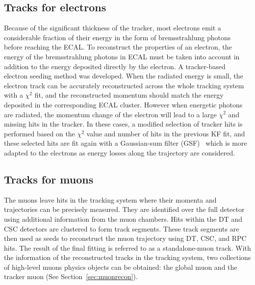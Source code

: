 \subsection{Tracks for electrons}
Because of the significant thickness of the tracker, most electrons emit a considerable fraction of their energy in the form of bremsstrahlung photons before reaching the ECAL. To reconstruct the properties of an electron, the energy of the bremsstrahlung photons in ECAL must be taken into account in addition to the energy deposited directly by the electron. A tracker-based electron seeding method was developed. When the radiated energy is small, the electron track can be accurately reconstructed across the whole tracking system with a $\chi^2$ fit, and the reconstructed momentum should match the energy deposited in the corresponding ECAL cluster. However when energetic photons are radiated, the momentum change of the electron will lead to a large $\chi^2$ and missing hits in the tracker. In these cases, a modified selection of tracker hits is performed based on the $\chi^2$ value and number of hits in the previous KF fit, and these selected hits are fit again with a Gaussian-sum filter (GSF)~\cite{ob_electronconst} which is more adapted to the electrons as energy losses along the trajectory are considered. 

\subsection{Tracks for muons}
The muons leave hits in the tracking system where their momenta and trajectories can be precisely measured. They are identified over the full detector using additional information from the muon chambers. Hits within the DT and CSC detectors are clustered to form track segments. These track segments are then used as seeds to reconstruct the muon trajectory using DT, CSC, and RPC hits. The result of the final fitting is referred to as a standalone-muon track. With the information of the reconstructed tracks in the tracking system, two collections of high-level muons physics objects can be obtained: the global muon and the tracker muon (See Section~\ref{sec:muonrecon}).

